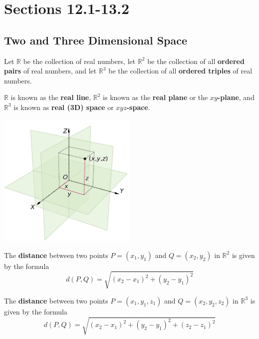 \documentclass[letterpaper, twoside, 12pt]{book}
\begin{document}
\setcounter{chapter}{0}

\chapter{Sections 12.1-13.2}

\setcounter{chapter}{12}

\section{Two and Three Dimensional Space}

\begin{definition}
  Let $\mathbb{R}$ be the collection of real numbers, let $\mathbb{R}^2$ be the
  collection of all \textbf{ordered pairs} of real numbers, and let $\mathbb{R}^3$
  be the collection of all \textbf{ordered triples} of real numbers.

  $\mathbb{R}$ is known as the \textbf{real line}, $\mathbb{R}^2$ is known
  as the \textbf{real plane} or the \textbf{$xy$-plane}, and $\mathbb{R}^3$
  is known as \textbf{real (3D) space} or \textbf{$xyz$-space}.
\end{definition}

\begin{center}
  \includegraphics[width=0.5\textwidth]{assets/3dCoordinateSystem.pdf}
\end{center}

\begin{definition}
  The \textbf{distance} between two points $P=(x_1,y_1)$ and
  $Q=(x_2,y_2)$ in $\mathbb{R}^2$ is given by the formula
  \[
    d(P,Q) = \sqrt{(x_2-x_1)^2+(y_2-y_1)^2}
  \]

  The \textbf{distance} between two points $P=(x_1,y_1,z_1)$ and
  $Q=(x_2,y_2,z_2)$ in $\mathbb{R}^3$ is given by the formula
  \[
    d(P,Q) = \sqrt{(x_2-x_1)^2+(y_2-y_1)^2+(z_2-z_1)^2}
  \]
\end{definition}
\end{document}
